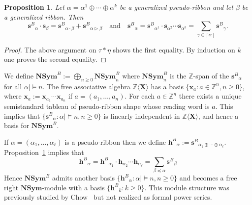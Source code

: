 \documentclass{amsart}
\newtheorem{proposition}[theorem]{Proposition}
\newtheorem*{Young's Rule}{Young's Rule}
\theoremstyle{definition}
\theoremstyle{remark}
\numberwithin{equation}{section}
\begin{document}
\begin{proposition}\label{prop:NSymB}
Let $\alpha=\alpha^1\oplus\cdots\oplus\alpha^k$ be a generalized pseudo-ribbon and let $\beta$ be a generalized ribbon. Then
\[ {\mathbf{s}^B}_{\alpha}\cdot{{\mathbf s}}_\beta = {\mathbf{s}^B}_{\alpha\cdot\beta} + {\mathbf{s}^B}_{\alpha\rhd\beta} {\quad\text{and}\quad}
{\mathbf{s}^B}_\alpha = {\mathbf{s}^B}_{\alpha^1} \cdot {{\mathbf s}}_{\alpha^2} \cdots {{\mathbf s}}_{\alpha^k} = \sum_{\gamma\in[\alpha]} {\mathbf{s}^B}_\gamma. \]
\end{proposition}

\begin{proof}
The above argument on $\tau*\eta$ shows the first equality. By induction on $k$ one proves the second equality.
\end{proof}

We define ${\mathbf{NSym}}^B:=\bigoplus_{n\ge0}{\mathbf{NSym}}^B_n$ where ${\mathbf{NSym}}^B_n$ is the ${{\mathbb Z}}$-span of the ${\mathbf{s}^B}_\alpha$ for all $\alpha\mid\models n$. The free associative algebra ${{\mathbb Z}}\langle {\mathbf{X}} \rangle$ has a basis $\{{{\mathbf x}}_a: a\in{{\mathbb Z}}^n, n\ge0\}$, where ${{\mathbf x}}_a:={{\mathbf x}}_{a_1}\cdots{{\mathbf x}}_{a_n}$ if $a=(a_1,\ldots,a_n)$. For each $a\in{{\mathbb Z}}^n$ there exists a unique semistandard tableau of pseudo-ribbon shape whose reading word is $a$. This implies that $\{{\mathbf{s}^B}_\alpha:\alpha\mid\models n, n\ge0\}$ is linearly independent in ${{\mathbb Z}}\langle{\mathbf{X}}\rangle$, and hence a basis for ${\mathbf{NSym}}^B$. 

If $\alpha=(\alpha_1,\ldots,\alpha_\ell)$ is a pseudo-ribbon then we define ${\mathbf{h}^B}_\alpha:={\mathbf{s}^B}_{\alpha_1\oplus\cdots\oplus\alpha_\ell}$. Proposition~\ref{prop:NSymB} implies that 
\[ {\mathbf{h}^B}_\alpha={\mathbf{h}^B}_{\alpha_1}\cdot {{\mathbf h}}_{\alpha_2}\cdots{{\mathbf h}}_{\alpha_\ell} = \sum_{\beta{\operatorname{\preccurlyeq}} \alpha}{\mathbf{s}^B}_\beta\]
Hence ${\mathbf{NSym}}^B$ admits another basis $\{{\mathbf{h}^B}_\alpha:\alpha\mid\models n, n\ge0\}$ and becomes a free right ${\mathbf{NSym}}$-module with a basis $\{{\mathbf{h}^B}_{k}:k\ge0\}$. This module structure was previously studied  by Chow~\cite{Chow} but not realized as formal power series.
\end{document}
